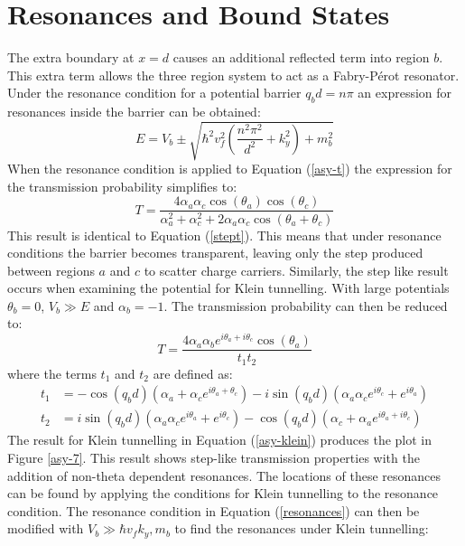 		\section{Resonances and Bound States}
		\label{Asymmetrical Barrier - Resonances and Bound States}
			The extra boundary at $x=d$ causes an additional reflected term into region $b$. This extra term allows the three region system to act as a Fabry-P\'{e}rot resonator. Under the resonance condition for a potential barrier $q_{b}d=n\pi$ \cite{b6} an expression for resonances inside the barrier can be obtained:
			\begin{equation}
				E=V_{b}\pm\sqrt{\hbar^{2}v_{f}^{2}\left(\frac{n^{2}\pi^{2}}{d^{2}}+k_{y}^{2}\right)+m_{b}^{2}}
				\label{resonances}
			\end{equation}
			When the resonance condition is applied to Equation (\ref{asy-t}) the expression for the transmission probability simplifies to:
			\begin{equation}
				T=\frac{4\alpha_{a}\alpha_{c}\cos(\theta_{a})\cos(\theta_{c})}{\alpha_{a}^{2}+\alpha_{c}^{2}+2\alpha_{a}\alpha_{c}\cos(\theta_{a}+\theta_{c})}
				\label{}
			\end{equation}
			This result is identical to Equation (\ref{stept}). This means that under resonance conditions the barrier becomes transparent, leaving only the step produced between regions $a$ and $c$ to scatter charge carriers. Similarly, the step like result occurs when examining the potential for Klein tunnelling. With large potentials $\theta_{b}=0$, $V_{b}\gg E$ and $\alpha_{b}=-1$. The transmission probability can then be reduced to:
			\begin{equation}
				T=\frac{4\alpha_{a}\alpha_{b}e^{i\theta_{a}+i\theta_{c}}\cos(\theta_{a})}{t_{1}t_{2}}
			\label{asy-klein}
			\end{equation}
			where the terms $t_{1}$ and $t_{2}$ are defined as:
			\begin{align}
				t_{1}&=-\cos(q_{b}d)\left(\alpha_{a}+\alpha_{c}e^{i\theta_{a}+\theta_{c}}\right)-i\sin(q_{b}d)\left(\alpha_{a}\alpha_{c}e^{i\theta_{c}}+e^{i\theta_{a}}\right)\\
						t_{2}&=i\sin(q_{b}d)\left(\alpha_{a}\alpha_{c}e^{i\theta_{a}}+e^{i\theta_{c}}\right)-\cos(q_{b}d)\left(\alpha_{c}+\alpha_{a}e^{i\theta_{a}+i\theta_{c}}\right)
			\end{align}
			The result for Klein tunnelling in Equation (\ref{asy-klein}) produces the plot in Figure \ref{asy-7}. This result shows step-like transmission properties with the addition of non-theta dependent resonances. The locations of these resonances can be found by applying the conditions for Klein tunnelling to the resonance condition. The resonance condition in Equation (\ref{resonances}) can then be modified with $V_{b}\gg\hbar v_{f}k_{y},m_{b}$ to find the resonances under Klein tunnelling:
